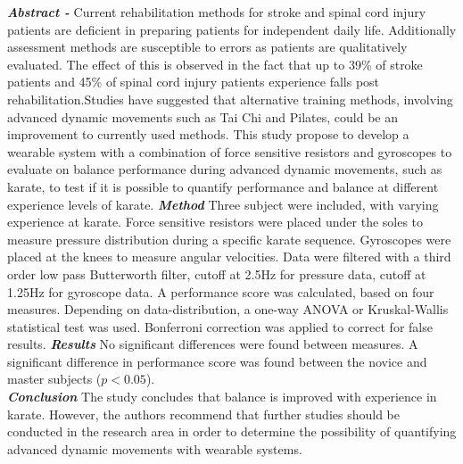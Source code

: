 \textbf{\textit{Abstract -}} Current rehabilitation methods for stroke and spinal cord injury patients are deficient in preparing patients for independent daily life. Additionally assessment methods are susceptible to errors as patients are qualitatively evaluated. The effect of this is observed in the fact that up to 39\% of stroke patients and 45\% of spinal cord injury patients experience falls post rehabilitation.Studies have suggested that alternative training methods, involving advanced dynamic movements such as Tai Chi and Pilates, could be an improvement to currently used methods. This study propose to develop a wearable system with a combination of force sensitive resistors and gyroscopes to evaluate on balance performance during advanced dynamic movements, such as karate, to test if it is possible to quantify performance and balance at different experience levels of karate. \textbf{\textit{Method}} Three subject were included, with varying experience at karate. Force sensitive resistors were placed under the soles to measure pressure distribution during a specific karate sequence. Gyroscopes were placed at the knees to measure angular velocities. Data were filtered with a third order low pass Butterworth filter, cutoff at 2.5Hz for pressure data, cutoff at 1.25Hz for gyroscope data. A performance score was calculated, based on four measures. Depending on data-distribution, a one-way ANOVA or Kruskal-Wallis statistical test was used. Bonferroni correction was applied to correct for false results. \textbf{\textit{Results}} No significant differences were found between measures. A significant difference in performance score was found between the novice and master subjects ($p<0.05$).\\ \textbf{\textit{Conclusion}} The study concludes that balance is improved with experience in karate. However, the authors recommend that further studies should be conducted in the research area in order to determine the possibility of quantifying advanced dynamic movements with wearable systems.